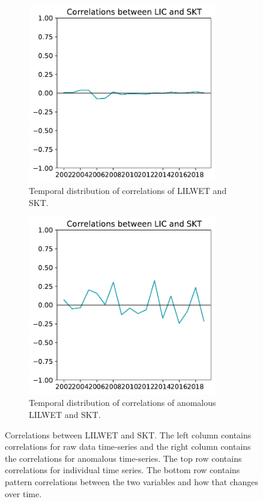 \documentclass[../main.tex]{subfiles}
\begin{document}
\begin{figure}[h!]
\begin{subfigure}[h!]{0.49\textwidth}
\end{subfigure}
\begin{subfigure}[h!]{0.49\textwidth}
\centering
\includegraphics[width=0.9\textwidth]{images/week8/hres/corr_lic_skt_shortterm_temporal}
\caption{Temporal distribution of correlations of LILWET and SKT.}
\end{subfigure}
\begin{subfigure}[h!]{0.49\textwidth}
\centering
\includegraphics[width=0.9\textwidth]{images/week8/hres/corr_lic_skt_shortterm_temporal_anmomalous}
\caption{Temporal distribution of correlations of anomalous LILWET and SKT.}
\end{subfigure}
\caption{Correlations between LILWET and SKT. The left column contains correlations for raw data time-series and the right column contains the correlations for anomalous time-series. The top row contains correlations for individual time series. The bottom row contains pattern correlations between the two variables and how that changes over time.}
\label{fig:correlation_between_SIC_and_SKT.}
\end{figure}
\end{document}
